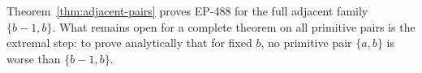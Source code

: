 \begin{remark}
Theorem~\ref{thm:adjacent-pairs} proves EP-488 for the full adjacent family
$\{b-1,b\}$. What remains open for a complete theorem on all primitive pairs is
the extremal step: to prove analytically that for fixed $b$, no primitive pair
$\{a,b\}$ is worse than $\{b-1,b\}$.
\end{remark}
